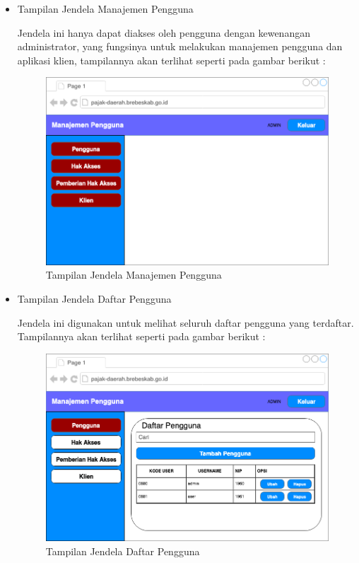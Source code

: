 \documentclass[pdftex,12pt, oneside]{article}
\begin{document}
\begin{itemize}
	\item Tampilan Jendela Manajemen Pengguna
	
	Jendela ini hanya dapat diakses oleh pengguna dengan kewenangan administrator, yang fungsinya untuk melakukan manajemen pengguna dan aplikasi klien, tampilannya akan terlihat seperti pada gambar berikut :
	
	\begin{figure}[H]
		\centering
		\includegraphics[width=1\textwidth]{./resources/manage-user-main-ui}
		\caption{Tampilan Jendela Manajemen Pengguna}
		\label{fig:manage-user-main-ui}
	\end{figure}
	
	\item Tampilan Jendela Daftar Pengguna
	
	Jendela ini digunakan untuk melihat seluruh daftar pengguna yang terdaftar. Tampilannya akan terlihat seperti pada gambar berikut :
	
	\begin{figure}[H]
		\centering
		\includegraphics[width=1\textwidth]{./resources/list-user-ui}
		\caption{Tampilan Jendela Daftar Pengguna}
		\label{fig:list-user-ui}
	\end{figure}
	

\end{itemize}
\end{document}
